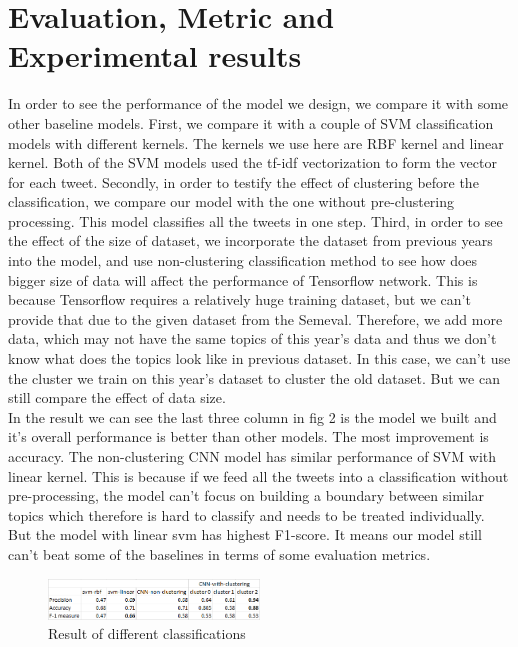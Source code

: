\documentclass[conference]{IEEEtran}
\begin{document}
\section{Evaluation, Metric and Experimental results}
In order to see the performance of the model we design, we compare it with some other baseline models. First, we compare it with a couple of SVM classification models with different kernels. The kernels we use here are RBF kernel and linear kernel. Both of the SVM models used the tf-idf vectorization to form the vector for each tweet. Secondly, in order to testify the effect of clustering before the classification, we compare our model with the one without pre-clustering processing. This model classifies all the tweets in one step.
Third, in order to see the effect of the size of dataset, we incorporate the dataset from previous years into the model, and use non-clustering classification method to see how does bigger size of data will affect the performance of Tensorflow network. This is because Tensorflow requires a relatively huge training dataset, but we can't provide that due to the given dataset from the Semeval. Therefore, we add more data, which may not have the same topics of this year's data and thus we don't know what does the topics look like in previous dataset. In this case, we can't use the cluster we train on this year's dataset to cluster the old dataset. But we can still compare the effect of data size.
\\ \indent
In the result we can see the last three column in fig 2 is the model we built and it's overall performance is better than other models. The most improvement is accuracy. The non-clustering CNN model has similar performance of SVM with linear kernel. This is because if we feed all the tweets into a classification without pre-processing, the model can't focus on building a boundary between similar topics which therefore is hard to classify and needs to be treated individually. But the model with linear svm has highest F1-score. It means our model still can't beat some of the baselines in terms of some evaluation metrics.

\begin{figure}[h]
\centering
\includegraphics[width=0.5\textwidth]{Capture}
\caption{Result of different classifications}

\end{figure}
\end{document}

